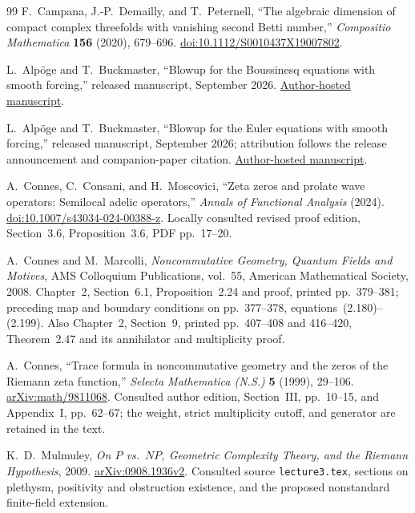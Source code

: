 \begin{thebibliography}{99}
F.~Campana, J.-P.~Demailly, and T.~Peternell,
``The algebraic dimension of compact complex threefolds with vanishing
second Betti number,'' \emph{Compositio Mathematica} \textbf{156}
(2020), 679--696.
\href{https://doi.org/10.1112/S0010437X19007802}{doi:10.1112/S0010437X19007802}.

L.~Alp\"oge and T.~Buckmaster,
``Blowup for the Boussinesq equations with smooth forcing,''
released manuscript, September 2026.
\href{https://cims.nyu.edu/~tristanb/boussinesq.pdf}{Author-hosted manuscript}.

L.~Alp\"oge and T.~Buckmaster,
``Blowup for the Euler equations with smooth forcing,''
released manuscript, September 2026; attribution follows the release
announcement and companion-paper citation.
\href{https://cims.nyu.edu/~tristanb/euler.pdf}{Author-hosted manuscript}.

A.~Connes, C.~Consani, and H.~Moscovici,
``Zeta zeros and prolate wave operators: Semilocal adelic operators,''
\emph{Annals of Functional Analysis} (2024).
\href{https://doi.org/10.1007/s43034-024-00388-z}{doi:10.1007/s43034-024-00388-z}.
Locally consulted revised proof edition, Section~3.6, Proposition~3.6,
PDF pp.~17--20.

A.~Connes and M.~Marcolli,
\emph{Noncommutative Geometry, Quantum Fields and Motives},
AMS Colloquium Publications, vol.~55, American Mathematical Society, 2008.
Chapter~2, Section~6.1, Proposition~2.24 and proof,
printed pp.~379--381; preceding map and boundary conditions on
pp.~377--378, equations~(2.180)--(2.199).
Also Chapter~2, Section~9, printed pp.~407--408 and 416--420,
Theorem~2.47 and its annihilator and multiplicity proof.

A.~Connes,
``Trace formula in noncommutative geometry and the zeros of the
Riemann zeta function,'' \emph{Selecta Mathematica (N.S.)}
\textbf{5} (1999), 29--106.
\href{https://arxiv.org/abs/math/9811068}{arXiv:math/9811068}.
Consulted author edition, Section~III, pp.~10--15, and Appendix~I,
pp.~62--67; the weight, strict multiplicity cutoff, and generator
are retained in the text.

K.~D.~Mulmuley,
\emph{On $P$ vs.~$NP$, Geometric Complexity Theory, and the Riemann Hypothesis},
2009. \href{https://arxiv.org/abs/0908.1936v2}{arXiv:0908.1936v2}.
Consulted source \texttt{lecture3.tex}, sections on plethysm,
positivity and obstruction existence, and the proposed nonstandard
finite-field extension.


\end{thebibliography}
